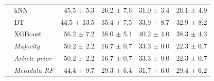 \begin{table}[t]
\begin{tabular}{l l r r r r}
 & kNN & 45.5 $\pm$ 5.3 & 26.2 $\pm$ 7.6 & 31.0 $\pm$ 3.4 & 26.1 $\pm$ 4.9 \\
 & DT & 44.5 $\pm$ 13.5 & 35.4 $\pm$ 7.5 & 33.9 $\pm$ 8.7 & 32.9 $\pm$ 8.2 \\
 & XGBoost & 56.2 $\pm$ 7.2 & 38.0 $\pm$ 5.1 & 40.2 $\pm$ 4.0 & 38.3 $\pm$ 4.3 \\
 & \textit{Majority} & 50.2 $\pm$ 2.2 & 16.7 $\pm$ 0.7 & 33.3 $\pm$ 0.0 & 22.3 $\pm$ 0.7 \\
 & \textit{Article prior} & 50.2 $\pm$ 2.2 & 16.7 $\pm$ 0.7 & 33.3 $\pm$ 0.0 & 22.3 $\pm$ 0.7 \\
 & \textit{Metadata RF} & 44.4 $\pm$ 9.7 & 29.3 $\pm$ 6.4 & 31.7 $\pm$ 6.0 & 29.4 $\pm$ 6.2 \\
\bottomrule
\end{tabular}
\end{table}
